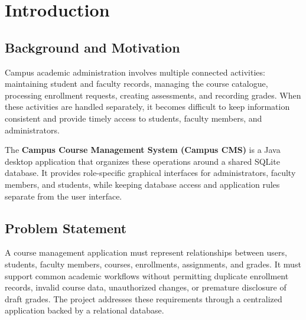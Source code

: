 \section{Introduction}
\label{sec:introduction}

\subsection{Background and Motivation}
Campus academic administration involves multiple connected activities: maintaining student and faculty records, managing the course catalogue, processing enrollment requests, creating assessments, and recording grades. When these activities are handled separately, it becomes difficult to keep information consistent and provide timely access to students, faculty members, and administrators.

The \textbf{Campus Course Management System (Campus CMS)} is a Java desktop application that organizes these operations around a shared SQLite database. It provides role-specific graphical interfaces for administrators, faculty members, and students, while keeping database access and application rules separate from the user interface.

\subsection{Problem Statement}
A course management application must represent relationships between users, students, faculty members, courses, enrollments, assignments, and grades. It must support common academic workflows without permitting duplicate enrollment records, invalid course data, unauthorized changes, or premature disclosure of draft grades. The project addresses these requirements through a centralized application backed by a relational database.

